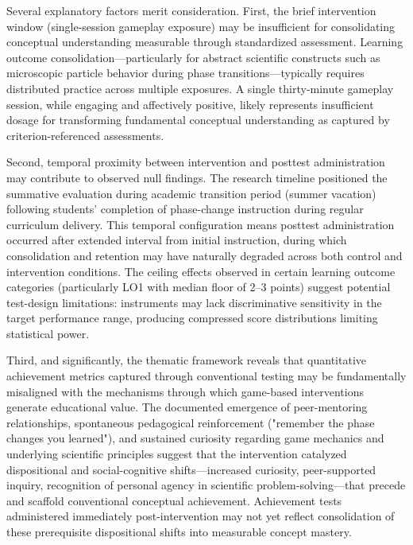 Several explanatory factors merit consideration. First, the brief intervention window (single-session gameplay exposure) may be insufficient for consolidating conceptual understanding measurable through standardized assessment. Learning outcome consolidation---particularly for abstract scientific constructs such as microscopic particle behavior during phase transitions---typically requires distributed practice across multiple exposures. A single thirty-minute gameplay session, while engaging and affectively positive, likely represents insufficient dosage for transforming fundamental conceptual understanding as captured by criterion-referenced assessments.

Second, temporal proximity between intervention and posttest administration may contribute to observed null findings. The research timeline positioned the summative evaluation during academic transition period (summer vacation) following students' completion of phase-change instruction during regular curriculum delivery. This temporal configuration means posttest administration occurred after extended interval from initial instruction, during which consolidation and retention may have naturally degraded across both control and intervention conditions. The ceiling effects observed in certain learning outcome categories (particularly LO1 with median floor of 2--3 points) suggest potential test-design limitations: instruments may lack discriminative sensitivity in the target performance range, producing compressed score distributions limiting statistical power.

Third, and significantly, the thematic framework reveals that quantitative achievement metrics captured through conventional testing may be fundamentally misaligned with the mechanisms through which game-based interventions generate educational value. The documented emergence of peer-mentoring relationships, spontaneous pedagogical reinforcement ("remember the phase changes you learned"), and sustained curiosity regarding game mechanics and underlying scientific principles suggest that the intervention catalyzed dispositional and social-cognitive shifts---increased curiosity, peer-supported inquiry, recognition of personal agency in scientific problem-solving---that precede and scaffold conventional conceptual achievement. Achievement tests administered immediately post-intervention may not yet reflect consolidation of these prerequisite dispositional shifts into measurable concept mastery.

